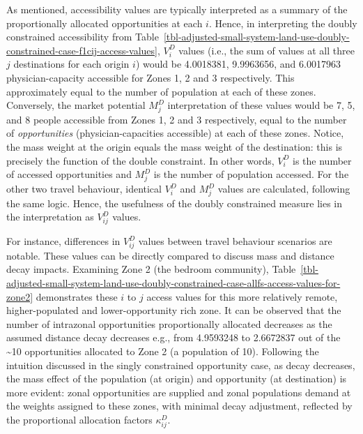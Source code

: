 \documentclass[
  10pt,
  letterpaper,
]{article}
\begin{document}
As mentioned, accessibility values are typically interpreted as a
summary of the proportionally allocated opportunities at each \(i\).
Hence, in interpreting the doubly constrained accessibility from
Table~\ref{tbl-adjusted-small-system-land-use-doubly-constrained-case-f1cij-access-values},
\(V_i^D\) values (i.e., the sum of values at all three \(j\)
destinations for each origin \(i\)) would be 4.0018381, 9.9963656, and
6.0017963 physician-capacity accessible for Zones 1, 2 and 3
respectively. This approximately equal to the number of population at
each of these zones. Conversely, the market potential \(M_j^D\)
interpretation of these values would be 7, 5, and 8 people accessible
from Zones 1, 2 and 3 respectively, equal to the number of
\emph{opportunities} (physician-capacities accessible) at each of these
zones. Notice, the mass weight at the origin equals the mass weight of
the destination: this is precisely the function of the double
constraint. In other words, \(V_i^D\) is the number of accessed
opportunities and \(M_j^D\) is the number of population accessed. For
the other two travel behaviour, identical \(V_i^D\) and \(M_j^D\) values
are calculated, following the same logic. Hence, the usefulness of the
doubly constrained measure lies in the interpretation as \(V_{ij}^D\)
values.

For instance, differences in \(V_{ij}^D\) values between travel
behaviour scenarios are notable. These values can be directly compared
to discuss mass and distance decay impacts. Examining Zone 2 (the
bedroom community),
Table~\ref{tbl-adjusted-small-system-land-use-doubly-constrained-case-allfs-access-values-for-zone2}
demonstrates these \(i\) to \(j\) access values for this more relatively
remote, higher-populated and lower-opportunity rich zone. It can be
observed that the number of intrazonal opportunities proportionally
allocated decreases as the assumed distance decay decreases e.g., from
4.9593248 to 2.6672837 out of the \textasciitilde10 opportunities
allocated to Zone 2 (a population of 10). Following the intuition
discussed in the singly constrained opportunity case, as decay
decreases, the mass effect of the population (at origin) and opportunity
(at destination) is more evident: zonal opportunities are supplied and
zonal populations demand at the weights assigned to these zones, with
minimal decay adjustment, reflected by the proportional allocation
factors \(\kappa_{ij}^D\).
\end{document}
